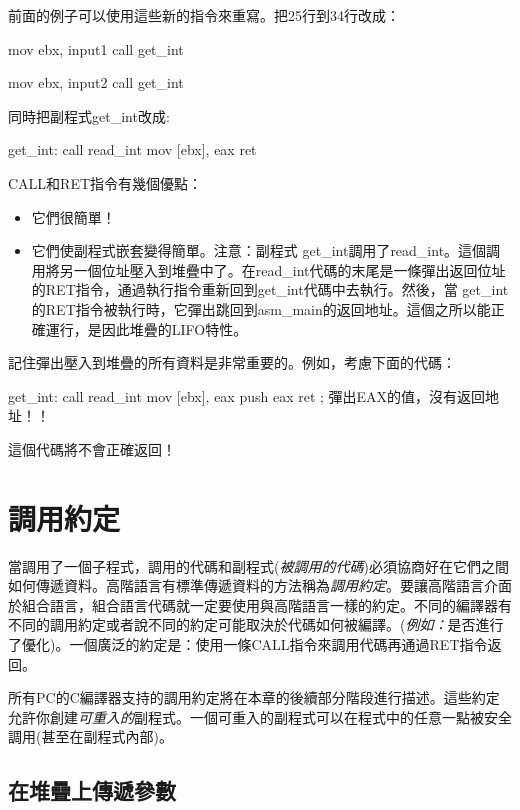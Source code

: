 前面的例子可以使用這些新的指令來重寫。把25行到34行改成：
\begin{AsmCodeListing}[numbers=none]
      mov    ebx, input1
      call   get_int

      mov    ebx, input2
      call   get_int
\end{AsmCodeListing}
同時把副程式{\code get\_int}改成:
\begin{AsmCodeListing}[numbers=none]
get_int:
      call   read_int
      mov    [ebx], eax
      ret
\end{AsmCodeListing}

CALL和RET指令有幾個優點：
\begin{itemize}
\item 它們很簡單！
\item 它們使副程式嵌套變得簡單。注意：副程式
{\code get\_int}調用了{\code read\_int}。這個調用將另一個位址壓入到堆疊中了。在{\code read\_int}代碼的末尾是一條彈出返回位址的RET指令，通過執行指令重新回到{\code get\_int}代碼中去執行。然後，當
{\code get\_int}的RET指令被執行時，它彈出跳回到{\code asm\_main}的返回地址。這個之所以能正確運行，是因此堆疊的LIFO特性。
\end{itemize}

記住彈出壓入到堆疊的所有資料是非常重要的。例如，考慮下面的代碼：
\begin{AsmCodeListing}[frame=none]
get_int:
      call   read_int
      mov    [ebx], eax
      push   eax
      ret                  ; 彈出EAX的值，沒有返回地址！！
\end{AsmCodeListing}
這個代碼將不會正確返回！

\section{調用約定}

當調用了一個子程式，調用的代碼和副程式(\emph{被調用的代碼})必須協商好在它們之間如何傳遞資料。高階語言有標準傳遞資料的方法稱為\emph{調用約定}。要讓高階語言介面於組合語言，組合語言代碼就一定要使用與高階語言一樣的約定。不同的編譯器有不同的調用約定或者說不同的約定可能取決於代碼如何被編譯。(\emph{例如：}是否進行了優化)。一個廣泛的約定是：使用一條{\code CALL}指令來調用代碼再通過{\code RET}指令返回。

所有PC的C編譯器支持的調用約定將在本章的後續部分階段進行描述。這些約定允許你創建\emph{可重入的}副程式。一個可重入的副程式可以在程式中的任意一點被安全調用(甚至在副程式內部)。

\subsection{在堆疊上傳遞參數}

